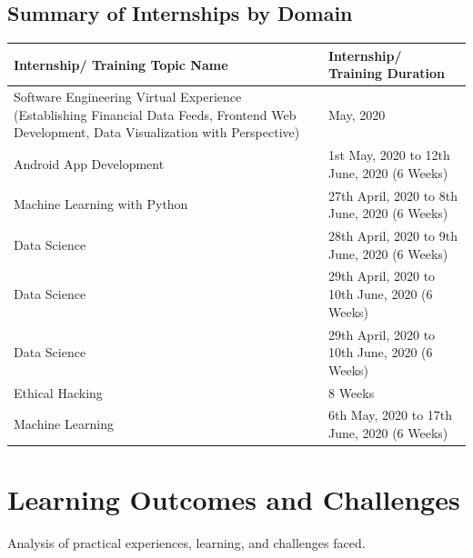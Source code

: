 \documentclass[11pt,a4paper]{article}
\newenvironment{card}{
    \begin{tcolorbox}[
        enhanced,
        colback=cardback,
        colframe=border,
        sharp corners,
        boxrule=0.5pt,
        drop shadow,
        drop shadow={shadow xshift=1mm,shadow yshift=-1mm,fill=border!50},
        boxsep=3mm,
        left=5mm, right=5mm, top=5mm, bottom=5mm,
        width=\textwidth,
        nobeforeafter
    ]
}{\end{tcolorbox}}
\begin{document}
\begin{card}
    \subsection*{\textcolor{accent}{Summary of Internships by Domain}}
    \vspace{0.3cm}
    \begin{longtable}{@{}p{}p{}@{}}
        \toprule
        \textbf{Internship/ Training Topic Name} & \textbf{Internship/ Training Duration} \\
        \midrule
        \endhead
        Software Engineering Virtual Experience (Establishing Financial Data Feeds, Frontend Web Development, Data Visualization with Perspective) & May, 2020 \\
        Android App Development & 1st May, 2020 to 12th June, 2020 (6 Weeks) \\
        Machine Learning with Python & 27th April, 2020 to 8th June, 2020 (6 Weeks) \\
        Data Science & 28th April, 2020 to 9th June, 2020 (6 Weeks) \\
        Data Science & 29th April, 2020 to 10th June, 2020 (6 Weeks) \\
        Data Science & 29th April, 2020 to 10th June, 2020 (6 Weeks) \\
        Ethical Hacking & 8 Weeks \\
        Machine Learning & 6th May, 2020 to 17th June, 2020 (6 Weeks) \\
        \bottomrule
    \end{longtable}
\end{card}

\clearpage

\section*{\textcolor{accent}{Learning Outcomes and Challenges}}
{\large\textcolor{muted}{Analysis of practical experiences, learning, and challenges faced.}}

\vspace{0.5cm}
\end{document}
